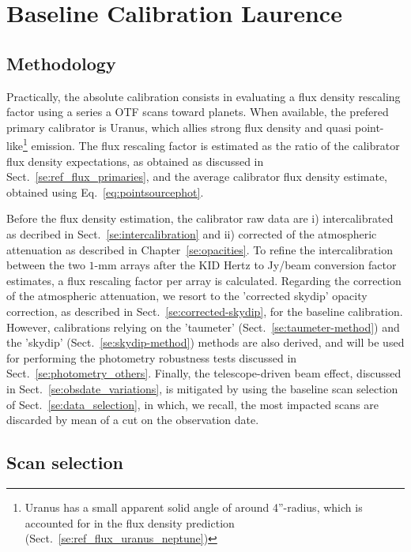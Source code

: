 \section{Baseline Calibration {\color{YellowGreen} Laurence} }
\label{se:baseline_calibration}

\subsection{Methodology}

Practically, the absolute calibration consists in evaluating a flux
density rescaling factor using a series a OTF scans toward
planets. When available, the prefered primary calibrator is Uranus,
which allies strong flux density and quasi point-like\footnote{Uranus
  has a small apparent solid angle of
  around 4''-radius, which is accounted for in the flux density
  prediction (Sect.~\ref{se:ref_flux_uranus_neptune})}
emission.
The flux rescaling factor is estimated as the ratio of the calibrator flux
density expectations, as obtained as discussed in
Sect.~\ref{se:ref_flux_primaries}, and the average calibrator flux
density estimate, obtained using Eq.~\ref{eq:pointsourcephot}.

Before the flux density estimation, the calibrator raw data are i)
intercalibrated as decribed
in Sect.~\ref{se:intercalibration} and ii) corrected of the
atmospheric attenuation as described in Chapter~\ref{se:opacities}. To
refine the intercalibration between the two $1$-mm arrays after the
KID Hertz to Jy/beam conversion factor estimates, a flux rescaling
factor per array is calculated. Regarding the correction of the
atmospheric attenuation, we
resort to the 'corrected skydip' opacity correction, as described in
Sect.~\ref{se:corrected-skydip}, for the baseline calibration.
However, calibrations relying on the
'taumeter' (Sect.~\ref{se:taumeter-method}) and the 'skydip'
(Sect.~\ref{se:skydip-method}) methods are also derived, and will be
used for performing the photometry robustness tests discussed in
Sect.~\ref{se:photometry_others}. Finally, the telescope-driven beam
effect, discussed in Sect.~\ref{se:obsdate_variations}, is mitigated by
using the baseline scan selection of
Sect.~\ref{se:data_selection}, in which, we recall, the most
impacted scans are discarded by mean of a cut on the observation
date. 


\subsection{Scan selection}

